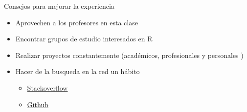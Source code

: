 \documentclass[
  10,
  ignorenonframetext,
]{beamer}
\providecommand{\tightlist}{%
  \setlength{\itemsep}{0pt}\setlength{\parskip}{0pt}}
\begin{document}
\begin{frame}{Consejos para mejorar la experiencia}
\protect\hypertarget{consejos-para-mejorar-la-experiencia}{}
\begin{itemize}
\tightlist
\item
  Aprovechen a los profesores en esta clase
\item
  Encontrar grupos de estudio interesados en R
\item
  Realizar proyectos constantemente (académicos, profesionales y
  personales )
\item
  Hacer de la busqueda en la red un hábito

  \begin{itemize}
  \tightlist
  \item
    \href{https://stackoverflow.com/}{Stackoverflow}
  \item
    \href{https://github.com/}{Github}
  \end{itemize}
\end{itemize}
\end{frame}
\end{document}
